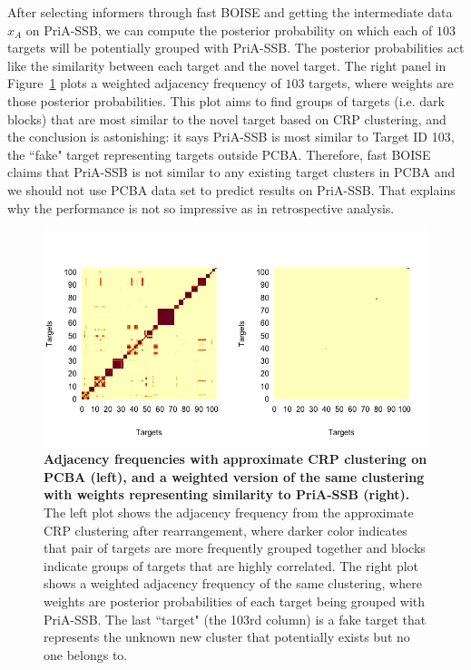 \documentclass[11pt,a4paper]{article}
\theoremstyle{plain}
\begin{document}
After selecting informers through fast BOISE and getting the intermediate data $x_A$ on PriA-SSB, we can compute the posterior probability on which each of $103$ targets will be potentially grouped with PriA-SSB. The posterior probabilities act like the similarity between each target and the novel target. 
The right panel in Figure~\ref{fig:pcba_prospective_clustering} plots a weighted adjacency frequency of $103$ targets, where weights are those posterior probabilities. 
This plot aims to find groups of targets (i.e. dark blocks) that are most similar to the novel target based on CRP clustering, and the conclusion is astonishing: it says PriA-SSB is most similar to Target ID 103, the ``fake" target representing targets outside PCBA.
Therefore, fast BOISE claims that PriA-SSB is not similar to any existing target clusters in PCBA and we should not use PCBA data set to predict results on PriA-SSB. That explains why the performance is not so impressive as in retrospective analysis. 

\begin{figure}[!ht]
\centering
\includegraphics[width=5.0in]{Figs/Adj_matices.png}
\caption{\label{fig:pcba_prospective_clustering} 
{\bf Adjacency frequencies with approximate CRP clustering on PCBA (left), and a weighted version of the same clustering with weights representing similarity to PriA-SSB (right).} The left plot shows the adjacency frequency from the approximate CRP clustering after rearrangement, where darker color indicates that pair of targets are more frequently grouped together and blocks indicate groups of targets that are highly correlated. The right plot shows a weighted adjacency frequency of the same clustering, where weights are posterior probabilities of each target being grouped with PriA-SSB. The last ``target" (the 103rd column) is a fake target that represents the unknown new cluster that potentially exists but no one belongs to. }
\end{figure}
\end{document}
